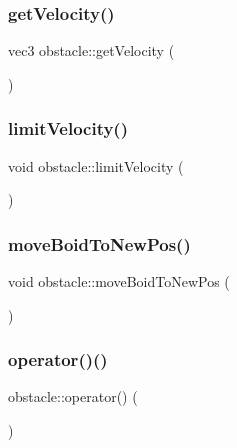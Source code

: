 \mbox{\label{classobstacle_a113bdf5134eb546d016594aecaac21d1}} 
\subsubsection{\texorpdfstring{get\+Velocity()}{getVelocity()}}
{\footnotesize\ttfamily vec3 obstacle\+::get\+Velocity (\begin{DoxyParamCaption}{ }\end{DoxyParamCaption})}

\mbox{\label{classobstacle_a3f291286885f30c88f7b8feefebcd8f6}} 
\subsubsection{\texorpdfstring{limit\+Velocity()}{limitVelocity()}}
{\footnotesize\ttfamily void obstacle\+::limit\+Velocity (\begin{DoxyParamCaption}{ }\end{DoxyParamCaption})}

\mbox{\label{classobstacle_a53b6085a360d48259d61d2f90e8f34d5}} 
\subsubsection{\texorpdfstring{move\+Boid\+To\+New\+Pos()}{moveBoidToNewPos()}}
{\footnotesize\ttfamily void obstacle\+::move\+Boid\+To\+New\+Pos (\begin{DoxyParamCaption}{ }\end{DoxyParamCaption})}

\mbox{\label{classobstacle_a6a0499c0ae24d0b554527bd93a7c8c97}} 
\subsubsection{\texorpdfstring{operator()()}{operator()()}}
{\footnotesize\ttfamily obstacle\+::operator() (\begin{DoxyParamCaption}{ }\end{DoxyParamCaption})}


